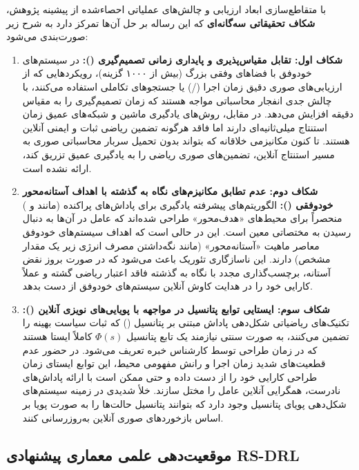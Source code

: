 \documentclass[oneside,openany,phd]{TMU-Thesis}
\begin{document}
با متقاطع‌سازی ابعاد ارزیابی و چالش‌های عملیاتی احصاءشده از پیشینه پژوهش، \textbf{شکاف تحقیقاتی سه‌گانه‌ای} که این رساله بر حل آن‌ها تمرکز دارد به شرح زیر صورت‌بندی می‌شود:

\begin{enumerate}
    \item \textbf{شکاف اول: تقابل مقیاس‌پذیری و پایداری زمانی تصمیم‌گیری ():}
    در سیستم‌های خودوفق با فضاهای وفقی بزرگ (بیش از ۱۰۰۰ گزینه)، رویکردهایی که از ارزیابی‌های صوری دقیق زمان اجرا (/) یا جستجوهای تکاملی استفاده می‌کنند، با چالش جدی انفجار محاسباتی مواجه هستند که زمان تصمیم‌گیری را به مقیاس دقیقه افزایش می‌دهد. در مقابل، روش‌های یادگیری ماشین و شبکه‌های عمیق زمان استنتاج میلی‌ثانیه‌ای دارند اما فاقد هرگونه تضمین ریاضی ثبات و ایمنی آنلاین هستند. تا کنون مکانیزمی خلاقانه که بتواند بدون تحمیل سربار محاسباتی صوری به مسیر استنتاج آنلاین، تضمین‌های صوری ریاضی را به یادگیری عمیق تزریق کند، ارائه نشده است.
    
    \item \textbf{شکاف دوم: عدم تطابق مکانیزم‌های نگاه به گذشته با اهداف آستانه‌محور خودوفقی ():}
    الگوریتم‌های پیشرفته یادگیری برای پاداش‌های پراکنده (مانند  و ) منحصراً برای محیط‌های «هدف‌محور» طراحی شده‌اند که عامل در آن‌ها به دنبال رسیدن به مختصاتی معین است. این در حالی است که اهداف سیستم‌های خودوفق معاصر ماهیت «آستانه‌محور» (مانند نگه‌داشتن مصرف انرژی زیر یک مقدار مشخص) دارند. این ناسازگاری تئوریک باعث می‌شود که در صورت بروز نقض آستانه، برچسب‌گذاری مجدد با نگاه به گذشته فاقد اعتبار ریاضی گشته و عملاً کارایی خود را در هدایت کاوش آنلاین سیستم‌های خودوفق از دست بدهد.
    
    \item \textbf{شکاف سوم: ایستایی توابع پتانسیل در مواجهه با پویایی‌های نویزی آنلاین ():}
    تکنیک‌های ریاضیاتی شکل‌دهی پاداش مبتنی بر پتانسیل () \cite{ng1999policy} که ثبات سیاست بهینه را تضمین می‌کنند، به صورت سنتی نیازمند یک تابع پتانسیل $\Phi(s)$ کاملاً ایستا هستند که در زمان طراحی توسط کارشناس خبره تعریف می‌شود. در حضور عدم قطعیت‌های شدید زمان اجرا و رانش مفهومی محیط، این توابع ایستای زمان طراحی کارایی خود را از دست داده و حتی ممکن است با ارائه پاداش‌های نادرست، همگرایی آنلاین عامل را مختل سازند. خلأ شدیدی در زمینه سیستم‌های شکل‌دهی پویای پتانسیل وجود دارد که بتوانند پتانسیل حالت‌ها را به صورت پویا بر اساس بازخوردهای صوری آنلاین به‌روزرسانی کنند.
\end{enumerate}

\subsection{موقعیت‌دهی علمی معماری پیشنهادی RS-DRL}
\label{sec:ch3_rsdrl_positioning}
\end{document}
